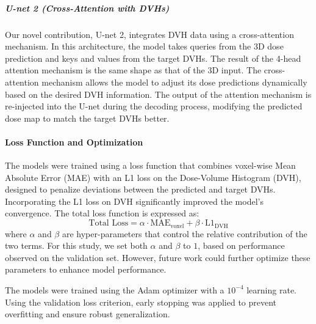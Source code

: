 \subparagraph{U-net 2 (Cross-Attention with DVHs)}
Our novel contribution, U-net 2, integrates DVH data using a cross-attention mechanism.
In this architecture, the model takes queries from the 3D dose prediction and keys and values from the target DVHs.
The result of the 4-head attention mechanism is the same shape as that of the 3D input.
The cross-attention mechanism allows the model to adjust its dose predictions dynamically based on the desired DVH information.
The output of the attention mechanism is re-injected into the U-net during the decoding process, modifying the predicted dose map to match the target DVHs better.

\paragraph{Loss Function and Optimization}
The models were trained using a loss function that combines voxel-wise Mean Absolute Error (MAE) with an L1 loss on the Dose-Volume Histogram (DVH), designed to penalize deviations between the predicted and target DVHs.
Incorporating the L1 loss on DVH significantly improved the model’s convergence.
The total loss function is expressed as:
$$
\text{Total Loss} = \alpha \cdot \text{MAE}_{\text{voxel}} + \beta \cdot \text{L1}_{\text{DVH}}
$$
where $\alpha$ and $\beta$ are hyper-parameters that control the relative contribution of the two terms.
For this study, we set both $\alpha$ and $\beta$ to $1$, based on performance observed on the validation set.
However, future work could further optimize these parameters to enhance model performance.

The models were trained using the Adam optimizer with a $10^{-4}$ learning rate.
Using the validation loss criterion, early stopping was applied to prevent overfitting and ensure robust generalization.



